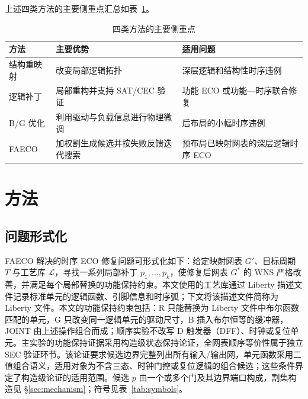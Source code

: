 \documentclass[twocolumn,10pt,fontset=windows]{ctexart}
\begin{document}
上述四类方法的主要侧重点汇总如表~\ref{tab:related_diff}。

\begin{table}[ht]
\centering
\caption{四类方法的主要侧重点}
\label{tab:related_diff}
\footnotesize
\setlength{\tabcolsep}{2pt}
\begin{tabular}{>{\raggedright\arraybackslash}p{1.55cm}>{\raggedright\arraybackslash}p{2.55cm}>{\raggedright\arraybackslash}p{3.2cm}}
\toprule
\textbf{方法} & \textbf{主要优势} & \textbf{适用问题} \\
\midrule
结构重映射 & 改变局部逻辑拓扑 & 深层逻辑和结构性时序违例 \\
逻辑补丁 & 局部重构并支持 SAT/CEC 验证 & 功能 ECO 或功能—时序联合修复 \\
B/G 优化 & 利用驱动与负载信息进行物理微调 & 后布局的小幅时序违例 \\
FAECO & 加权割生成候选并按失败反馈迭代搜索 & 预布局已映射网表的深层逻辑时序 ECO \\
\bottomrule
\end{tabular}
\end{table}

\section{方法}

\subsection{问题形式化}
FAECO 解决的时序 ECO 修复问题可形式化如下：给定映射网表 $G'$、目标周期 $T$ 与工艺库 $\mathcal{L}$，寻找一系列局部补丁 $p_1,\dots,p_k$，使修复后网表 $G^*$ 的 WNS 严格改善，并满足每个局部替换的功能保持约束。本文使用的工艺库通过 Liberty 描述文件记录标准单元的逻辑函数、引脚信息和时序弧；下文将该描述文件简称为 Liberty 文件。本文的功能保持约束包括：R 只能替换为 Liberty 文件中布尔函数匹配的单元，G 只改变同一逻辑单元的驱动尺寸，B 插入布尔恒等的缓冲器，JOINT 由上述操作组合而成；顺序实验不改写 D 触发器（DFF）、时钟或复位单元。主实验的功能保持证据采用构造级状态保持论证，全网表顺序等价性属于独立 SEC 验证环节。该论证要求候选边界完整列出所有输入/输出网，单元函数采用二值组合语义，适用对象为不含三态、时钟门控或复位逻辑的组合候选；这些条件界定了构造级论证的适用范围。候选 $p$ 由一个或多个门及其边界端口构成，割集构造见 \S\ref{sec:mechanism}；符号见表~\ref{tab:symbols}。
\end{document}
